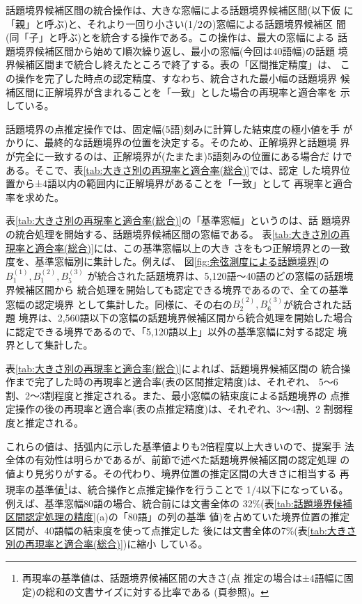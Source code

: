 話題境界候補区間の統合操作は、大きな窓幅による話題境界候補区間(以下仮
に「親」と呼ぶ)と、それより一回り小さい(1/2の)窓幅による話題境界候補区
間(同「子」と呼ぶ)とを統合する操作である。この操作は、最大の窓幅による
話題境界候補区間から始めて順次繰り返し、最小の窓幅(今回は40語幅)の話題
境界候補区間まで統合し終えたところで終了する。表の「区間推定精度」は、
この操作を完了した時点の認定精度、すなわち、統合された最小幅の話題境界
候補区間に正解境界が含まれることを「一致」とした場合の再現率と適合率を
示している。

話題境界の点推定操作では、固定幅(5語)刻みに計算した結束度の極小値を手
がかりに、最終的な話題境界の位置を決定する。そのため、正解境界と話題境
界が完全に一致するのは、正解境界が(たまたま)5語刻みの位置にある場合だ
けである。そこで、表\ref{tab:大きさ別の再現率と適合率(総合)}では、認定
した境界位置から±4語以内の範囲内に正解境界があることを「一致」として
再現率と適合率を求めた。

表\ref{tab:大きさ別の再現率と適合率(総合)}の「基準窓幅」というのは、話
題境界の統合処理を開始する、話題境界候補区間の窓幅である。
表\ref{tab:大きさ別の再現率と適合率(総合)}には、この基準窓幅以上の大き
さをもつ正解境界との一致度を、基準窓幅別に集計した。例えば、
図\ref{fig:余弦測度による話題境界}の$B^{(1)}_1, B^{(2)}_1, B^{(3)}_5$
が統合された話題境界は、5,120語〜40語のどの窓幅の話題境界候補区間から
統合処理を開始しても認定できる境界であるので、全ての基準窓幅の認定境界
として集計した。同様に、その右の$B^{(2)}_2, B^{(3)}_6$が統合された話題
境界は、2,560語以下の窓幅の話題境界候補区間から統合処理を開始した場合
に認定できる境界であるので、「5,120語以上」以外の基準窓幅に対する認定
境界として集計した。

表\ref{tab:大きさ別の再現率と適合率(総合)}によれば、話題境界候補区間の
統合操作まで完了した時の再現率と適合率(表の区間推定精度)は、それぞれ、
5〜6割、2〜3割程度と推定される。また、最小窓幅の結束度による話題境界の
点推定操作の後の再現率と適合率(表の点推定精度)は、それぞれ、3〜4割、2
割弱程度と推定される。

これらの値は、括弧内に示した基準値よりも2倍程度以上大きいので、提案手
法全体の有効性は明らかであるが、前節で述べた話題境界候補区間の認定処理
の値より見劣りがする。その代わり、境界位置の推定区間の大きさに相当する
再現率の基準値\footnote{再現率の基準値は、話題境界候補区間の大きさ(点
  推定の場合は±4語幅に固定)の総和の文書サイズに対する比率である
  (\pageref{sect:基準値}頁参照)。}は、統合操作と点推定操作を行うことで
1/4以下になっている。例えば、基準窓幅80語の場合、統合前には文書全体の
32\%(表\ref{tab:話題境界候補区間認定処理の精度}(a)の「80語」の列の基準
値)を占めていた境界位置の推定区間が、40語幅の結束度を使って点推定した
後には文書全体の7\%(表\ref{tab:大きさ別の再現率と適合率(総合)})に縮小
している。


